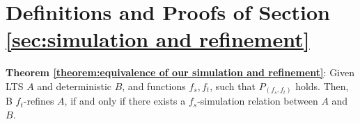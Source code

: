 











\section{Definitions and Proofs of Section \ref{sec:simulation and refinement}}
\label{sec:appendix definitions and proofs of section simulation and refinement}


{\noindent \bf Theorem \ref{theorem:equivalence of our simulation and refinement}}: Given LTS $A$ and deterministic $B$, and functions $f_s,f_t$, such that $P_{(f_s,f_t)}$ holds. Then, B $f_t$-refines $A$, if and only if there exists a $f_s$-simulation relation between $A$ and $B$.

